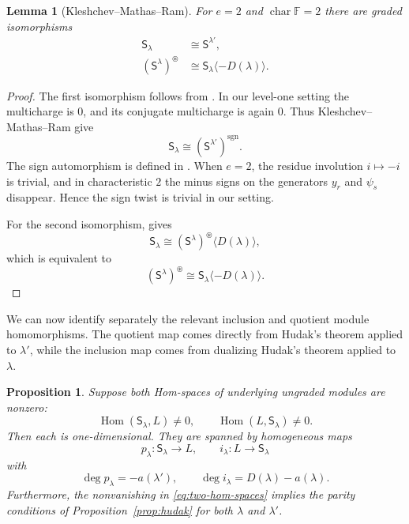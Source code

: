 \documentclass[11pt,reqno]{amsart}
\numberwithin{equation}{section}
\newtheorem{proposition}[theorem]{Proposition}
\newtheorem{lemma}[theorem]{Lemma}
\theoremstyle{remark}
\newcommand{\F}{\mathbb F}
\newcommand{\Hom}{\operatorname{Hom}}
\newcommand{\RS}{\mathsf S}
\newcommand{\CS}{\mathsf S}
\begin{document}
\begin{lemma}[Kleshchev--Mathas--Ram]\label{lem:duality}
For $e=2$ and $\operatorname{char}\F=2$ there are graded isomorphisms
\begin{align}
\CS_\lambda
&\cong \RS^{\lambda'},
\label{eq:column-row}\\
(\RS^\lambda)^{\circledast}
&\cong \CS_\lambda\langle-D(\lambda)\rangle.
\label{eq:row-dual-column}
\end{align}
\end{lemma}

\begin{proof}
The first isomorphism follows from
\cite[Theorem~8.5]{KMR}.  In our level-one setting the multicharge is $0$, and its conjugate multicharge is again $0$.  Thus Kleshchev--Mathas--Ram give
\[
\CS_\lambda\cong(\RS^{\lambda'})^{\mathrm{sgn}}.
\]
The sign automorphism is defined in \cite[(3.14)]{KMR}.  When $e=2$,
the residue involution $i\mapsto-i$ is trivial, and in characteristic
$2$ the minus signs on the generators $y_r$ and $\psi_s$ disappear.
Hence the sign twist is trivial in our setting.

For the second isomorphism,
\cite[Theorem~7.25]{KMR} gives
\[
\CS_\lambda
\cong
(\RS^\lambda)^{\circledast}\langle D(\lambda)\rangle,
\]
which is equivalent to
\[
(\RS^\lambda)^{\circledast}
\cong
\CS_\lambda\langle-D(\lambda)\rangle.
\]
\end{proof}
We can now identify separately the relevant inclusion and quotient module homomorphisms.  The quotient map comes directly from Hudak's theorem applied to $\lambda'$, while the inclusion map comes from dualizing Hudak's theorem applied to $\lambda$.
\begin{proposition}\label{prop:two-degrees}
Suppose both Hom-spaces of underlying ungraded modules are nonzero:
\begin{equation}\label{eq:two-hom-spaces}
\Hom(\CS_\lambda,L)\ne0,
\qquad
\Hom(L,\CS_\lambda)\ne0.
\end{equation}
Then each is one-dimensional.  They are spanned by homogeneous maps
\[
p_\lambda:\CS_\lambda\longrightarrow L,
\qquad
i_\lambda:L\longrightarrow\CS_\lambda
\]
with
\begin{equation}\label{eq:two-map-degrees}
\deg p_\lambda=-a(\lambda'),
\qquad
\deg i_\lambda=D(\lambda)-a(\lambda).
\end{equation}
Furthermore, the nonvanishing in \eqref{eq:two-hom-spaces}
implies the parity conditions of Proposition~\ref{prop:hudak}
for both $\lambda$ and $\lambda'$.
\end{proposition}
\end{document}

